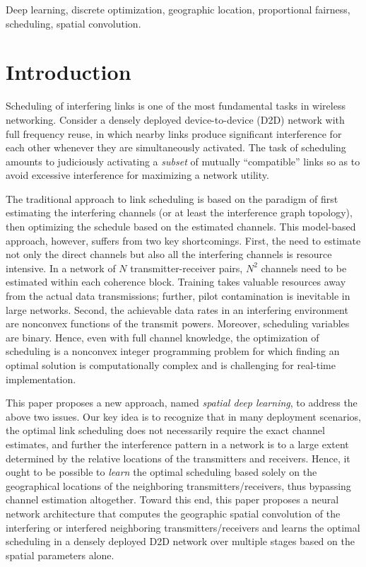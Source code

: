 \documentclass[journal,12pt,onecolumn,draftclsnofoot,]{IEEEtran}
\begin{document}
\begin{IEEEkeywords}
Deep learning, discrete optimization, geographic location, proportional fairness,
scheduling, spatial convolution.
\end{IEEEkeywords}

\IEEEpeerreviewmaketitle


\section{Introduction}

Scheduling of interfering links is one of the most fundamental tasks in
wireless networking. Consider a densely deployed device-to-device
(D2D) network with full frequency reuse, in which nearby links produce
significant interference for each other whenever they are simultaneously
activated. The task of scheduling amounts to judiciously activating
a \emph{subset} of mutually ``compatible'' links so as to avoid excessive
interference for maximizing a network utility.

The traditional approach to link scheduling is based on the paradigm of first
estimating the interfering channels (or at least the interference graph
topology), then optimizing the schedule based on the estimated channels.
This model-based approach, however, suffers from two key shortcomings.
First, the need to estimate not only the direct channels but also all the
interfering channels is resource intensive.  In a network of $N$
transmitter-receiver pairs, $N^2$ channels need to be estimated within each
coherence block. Training takes valuable resources away from the actual data
transmissions; further, pilot contamination is inevitable in large networks.
Second, the achievable data rates in an interfering environment are
nonconvex functions of the transmit powers. Moreover, scheduling variables
are binary. Hence, even with full channel knowledge, the optimization
of scheduling is a nonconvex integer programming problem for which finding
an optimal solution is computationally complex and is challenging for
real-time implementation.

This paper proposes a new approach, named \emph{spatial deep learning}, to address
the above two issues. Our key idea is to recognize that in many deployment
scenarios, the optimal link scheduling does not necessarily require the exact
channel estimates, and further the interference pattern in a network is to a
large extent determined by the relative locations of the transmitters and
receivers. Hence, it ought to be possible to \emph{learn} the optimal
scheduling based solely on the geographical locations of the neighboring
transmitters/receivers, thus bypassing channel estimation altogether. Toward
this end, this paper proposes a neural network architecture that computes the
geographic spatial convolution of the interfering or interfered neighboring
transmitters/receivers and learns the optimal scheduling in a densely
deployed D2D network over multiple stages based on the spatial parameters alone.
\end{document}

